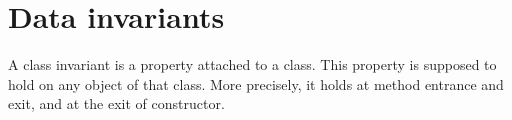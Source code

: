 \documentclass[a4paper,11pt,twoside,openright]{report}
\begin{document}







\section{Data invariants}


  A class invariant is a property attached to a class. This property
  is supposed to hold on any object of that class. More precisely, it
  holds at method entrance and exit, and at the exit of constructor.

\end{document}
